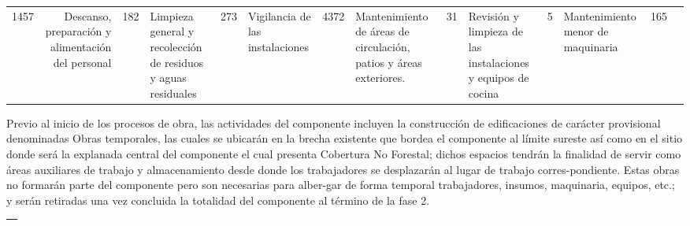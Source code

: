 \documentclass[twoside]{article}
\begin{document}
\begin{multicols}{2}
\begin{tabular}{ |p{ 7cm }|d{2.1}|}
\scriptsize 1457 &

\hline


\scriptsize Descanso, preparación y alimentación del personal &

\scriptsize 182 &

\hline


\scriptsize Limpieza general y recolección de residuos y aguas residuales &

\scriptsize 273 &

\hline


\scriptsize Vigilancia de las instalaciones &

\scriptsize 4372 &

\hline


\scriptsize Mantenimiento de áreas de circulación, patios y áreas exteriores. &

\scriptsize 31 &

\hline


\scriptsize Revisión y limpieza de las instalaciones y equipos de cocina &

\scriptsize 5 &

\hline


\scriptsize Mantenimiento menor de maquinaria &

\scriptsize 165 &

\hline


\end{tabular}

\bigskip

Previo al inicio de los procesos de obra, las actividades del componente incluyen la construcción de edificaciones de carácter provisional denominadas Obras temporales, las cuales se ubicarán en la brecha existente que bordea el componente al límite sureste así como en el sitio donde será la explanada central del componente el cual presenta Cobertura No Forestal; dichos espacios tendrán la finalidad de servir como áreas auxiliares de trabajo y almacenamiento desde donde los trabajadores se desplazarán al lugar de trabajo corres-pondiente. Estas obras no formarán parte del componente pero son necesarias para alber-gar de forma temporal trabajadores, insumos, maquinaria, equipos, etc.; y serán retiradas una vez concluida la totalidad del componente al término de la fase 2.

\bigskip

\begin{tabular}{ |p{ 7cm }|c|}
\hline
\multicolumn{ 2 }{|l|}{\cellcolor{myblue1}\scriptsize\color{white}{ Datos generales del componente para esta fase }}\\
\hline



\end{tabular}
\end{multicols}
\end{document}

